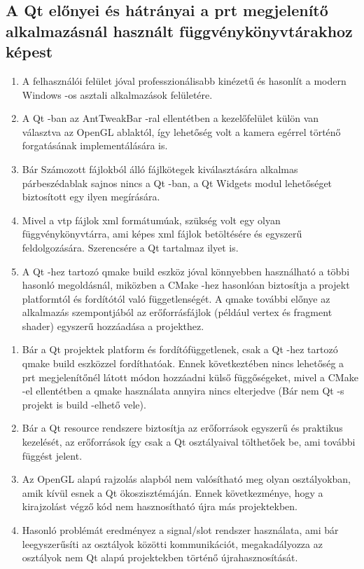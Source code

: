 \subsection{A Qt előnyei és hátrányai 
a prt megjelenítő alkalmazásnál használt 
függvénykönyvtárakhoz képest}

\begin{description}[font=\normalfont\itshape\space]
\item [Előnyök:] \hfill
\begin{enumerate}
\item
A felhasználói felület jóval professzionálisabb kinézetű 
és hasonlít a modern Windows -os asztali alkalmazások felületére.
\item
A Qt -ban az AntTweakBar -ral ellentétben a kezelőfelület 
külön van választva az OpenGL ablaktól, 
így lehetőség volt a kamera egérrel történő forgatásának implementálására is.
\item
Bár Számozott fájlokból álló fájlkötegek kiválasztására 
alkalmas párbeszédablak sajnos nincs a Qt -ban, 
a Qt Widgets modul lehetőséget biztosított egy ilyen megírására.
\item
Mivel a vtp fájlok xml formátumúak, 
szükség volt egy olyan függvénykönyvtárra, 
ami képes xml fájlok betöltésére és egyszerű feldolgozására. 
Szerencsére a Qt tartalmaz ilyet is.
\item
A Qt -hez tartozó qmake build eszköz jóval könnyebben használható 
a többi hasonló megoldásnál, 
miközben a CMake -hez hasonlóan biztosítja 
a projekt platformtól és fordítótól való függetlenségét. 
A qmake további előnye az alkalmazás szempontjából 
az erőforrásfájlok (például vertex és fragment shader) 
egyszerű hozzáadása a projekthez.
\end{enumerate}
\item [Hátrányok:] \hfill
\begin{enumerate}
\item
Bár a Qt projektek platform és fordítófüggetlenek, 
csak a Qt -hez tartozó qmake build eszközzel fordíthatóak. 
Ennek következtében nincs lehetőség a prt megjelenítőnél 
látott módon hozzáadni külső függőségeket, 
mivel a CMake -el ellentétben a qmake használata 
annyira nincs elterjedve 
(Bár nem Qt -s projekt is build -elhető vele). 
\item
Bár a Qt resource rendszere biztosítja az erőforrások egyszerű 
és praktikus kezelését, 
az erőforrások így csak a Qt osztályaival tölthetőek be, 
ami további függést jelent.
\item
Az OpenGL alapú rajzolás alapból nem valósítható meg olyan osztályokban, 
amik kívül esnek a Qt ökoszisztémáján. 
Ennek következménye, hogy a kirajzolást végző kód 
nem hasznosítható újra más projektekben.
\item
Hasonló problémát eredményez a signal/slot rendszer használata, 
ami bár leegyszerűsíti az osztályok közötti kommunikációt, 
megakadályozza az osztályok nem Qt alapú projektekben történő újrahasznosítását.
\end{enumerate}
\end{description}

